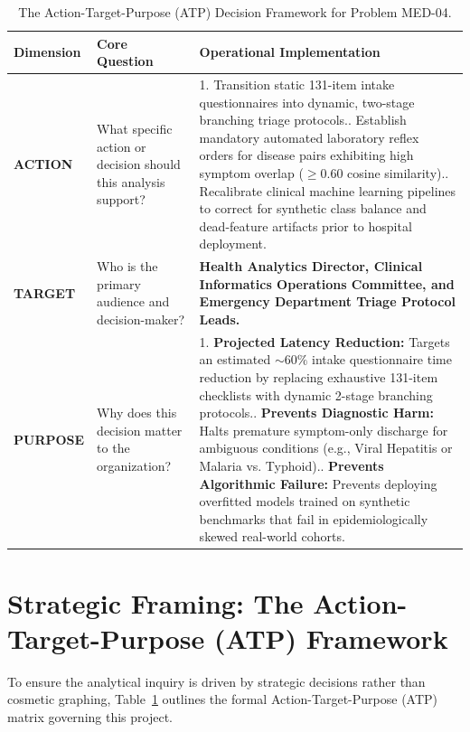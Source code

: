 \documentclass[conference]{IEEEtran}
\begin{document}
\begin{table}[t]
\centering
\small
\caption{The Action-Target-Purpose (ATP) Decision Framework for Problem MED-04.}
\label{tab:atp}
\begin{tabularx}{\textwidth}{l p{4.2cm} X}
\toprule
\textbf{Dimension} & \textbf{Core Question} & \textbf{Operational Implementation} \\
\midrule
\textbf{ACTION} & What specific action or decision should this analysis support? & 
1. Transition static 131-item intake questionnaires into dynamic, two-stage branching triage protocols.\newline
2. Establish mandatory automated laboratory reflex orders for disease pairs exhibiting high symptom overlap ($\ge 0.60$ cosine similarity).\newline
3. Recalibrate clinical machine learning pipelines to correct for synthetic class balance and dead-feature artifacts prior to hospital deployment. \\
\addlinespace
\textbf{TARGET} & Who is the primary audience and decision-maker? & 
\textbf{Health Analytics Director, Clinical Informatics Operations Committee, and Emergency Department Triage Protocol Leads.} \\
\addlinespace
\textbf{PURPOSE} & Why does this decision matter to the organization? & 
1. \textbf{Projected Latency Reduction:} Targets an estimated $\sim 60\%$ intake questionnaire time reduction by replacing exhaustive 131-item checklists with dynamic 2-stage branching protocols.\newline
2. \textbf{Prevents Diagnostic Harm:} Halts premature symptom-only discharge for ambiguous conditions (e.g., Viral Hepatitis or Malaria vs. Typhoid).\newline
3. \textbf{Prevents Algorithmic Failure:} Prevents deploying overfitted models trained on synthetic benchmarks that fail in epidemiologically skewed real-world cohorts. \\
\bottomrule
\end{tabularx}
\end{table}

\section{Strategic Framing: The Action-Target-Purpose (ATP) Framework}
To ensure the analytical inquiry is driven by strategic decisions rather than cosmetic graphing, Table~\ref{tab:atp} outlines the formal Action-Target-Purpose (ATP) matrix governing this project.
\end{document}
